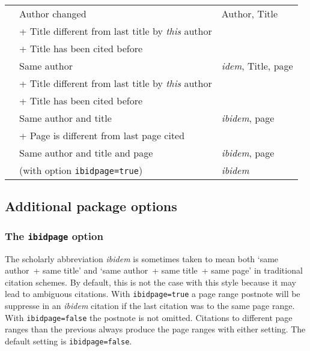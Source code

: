 \documentclass[a4paper]{article}
\newenvironment*{inlinetable}
  {\trivlist\footnotesize\item}
  {\endtrivlist}
\newcommand*{\code}[1]{%
  \detokenize\expandafter{\string#1}}
\begin{document}
\begin{inlinetable}
\begin{tabularx}{\linewidth}{@{}VlX@{}}
\cmidrule(r){1-1}\cmidrule(lr){2-2}\cmidrule(l){3-3}
\code{\cite{a1}}        & Author changed        & Author, Title \\
                        & + Title different from last title by \emph{this} author \\
                        & + Title has been cited before \\
\cmidrule(r){1-1}\cmidrule(lr){2-2}\cmidrule(l){3-3}
\code{\cite[55]{a2}}    & Same author           & \emph{idem}, Title, page \\
                        & + Title different from last title by \emph{this} author \\
                        & + Title has been cited before \\
\cmidrule(r){1-1}\cmidrule(lr){2-2}\cmidrule(l){3-3}
\code{\cite[25]{a2}}    & Same author and title & \emph{ibidem}, page \\
                        & + Page is different from last page cited \\
\cmidrule(r){1-1}\cmidrule(lr){2-2}\cmidrule(l){3-3}
\code{\cite[25]{a2}}    & Same author and title and page
						& \emph{ibidem}, page \\
\code{\cite[25]{a2}}    & (with option \texttt{ibidpage=true})
						& \emph{ibidem} \\
\bottomrule
\end{tabularx}
\end{inlinetable}

\clearpage

\subsection*{Additional package options}

\subsubsection*{The \texttt{ibidpage} option}

The scholarly abbreviation \emph{ibidem} is sometimes taken to mean
both `same author~+ same title' and `same author~+ same title~+ same
page' in traditional citation schemes. By default, this is not the
case with this style because it may lead to ambiguous citations.
With \texttt{ibidpage=true} a page range postnote will be suppresse
in an \emph{ibidem} citation if the last citation was to the same
page range. With \texttt{ibidpage=false} the postnote is not omitted.
Citations to different page ranges than the previous always produce
the page ranges with either setting.
The default setting is \texttt{ibidpage=false}.
\end{document}
